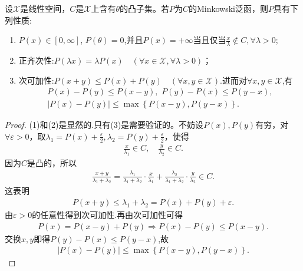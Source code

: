 \documentclass[../../main.tex]{subfiles}%
\begin{document}
\begin{proposition}\label{proposition:Minkowski泛函的基本性质}
设$\mathscr{X}$是线性空间，$C$是$\mathscr{X}$上含有$\theta$的凸子集。若$P$为$C$的Minkowski泛函，则$P$具有下列性质:
\begin{enumerate}[(1)]
\item\label{proposition:Minkowski泛函的基本性质-1} $P(x) \in [0, \infty]$, $P(\theta) = 0$,并且$P(x)=+\infty$当且仅当$\frac{x}{\lambda}\notin C,\forall \lambda >0$;

\item\label{proposition:Minkowski泛函的基本性质-2} 正齐次性:$P(\lambda x) = \lambda P(x) \quad (\forall x \in \mathscr{X}, \forall \lambda > 0)$；

\item\label{proposition:Minkowski泛函的基本性质-3} 次可加性:$P(x + y) \leqslant P(x) + P(y) \quad (\forall x, y \in \mathscr{X})$.进而对$\forall x,y\in \mathscr{X}$,有
\begin{gather*}
P\left( x \right) -P\left( y \right) \leqslant P\left( x-y \right) ,\,\, P\left( y \right) -P\left( x \right) \leqslant P\left( y-x \right) ,
\\
\left| P\left( x \right) -P\left( y \right) \right|\leqslant \max \left\{ P\left( x-y \right) ,P\left( y-x \right) \right\} .
\end{gather*}
\end{enumerate}
\end{proposition}
\begin{proof}
(1)和(2)是显然的.只有(3)是需要验证的。不妨设$P(x), P(y)$有穷，对$\forall \varepsilon > 0$，取$\lambda_1 = P(x) +\frac{ \varepsilon}{2}, \lambda_2 = P(y) +\frac{ \varepsilon}{2}$，使得
\begin{align*}
\frac{x}{\lambda_1} \in C, \quad \frac{y}{\lambda_2} \in C.
\end{align*}
因为$C$是凸的，所以
\begin{align*}
\frac{x + y}{\lambda_1 + \lambda_2} = \frac{\lambda_1}{\lambda_1 + \lambda_2} \cdot \frac{x}{\lambda_1} + \frac{\lambda_2}{\lambda_1 + \lambda_2} \cdot \frac{y}{\lambda_2} \in C.
\end{align*}
这表明
\begin{align*}
P(x + y) \leqslant \lambda_1 + \lambda_2 = P(x) + P(y) + \varepsilon.
\end{align*}
由$\varepsilon > 0$的任意性得到次可加性.再由次可加性可得
\begin{align*}
P\left( x \right) =P\left( x-y \right) +P\left( y \right) \Longrightarrow P\left( x \right) -P\left( y \right) \leqslant P\left( x-y \right) .
\end{align*}
交换$x,y$即得$P\left( y \right) -P\left( x \right) \leqslant P\left( y-x \right)$,故
\begin{align*}
\left| P\left( x \right) -P\left( y \right) \right|\leqslant \max \left\{ P\left( x-y \right) ,P\left( y-x \right) \right\} .
\end{align*}
\end{proof}
\end{document}
